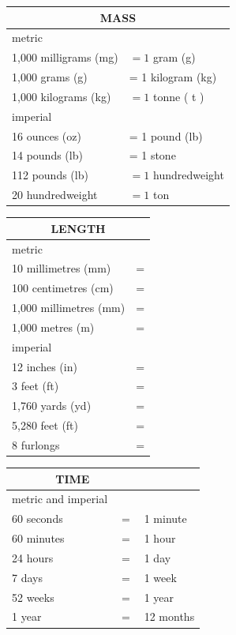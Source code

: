 \documentclass[10pt]{article}
\begin{document}
\begin{center}
\begin{tabular}{|l|l|}
\hline
\multicolumn{2}{|c|}{MASS} \\
\hline
metric &  \\
\hline
1,000 milligrams (mg) & $=1$ gram (g) \\
\hline
1,000 grams (g) & = 1 kilogram (kg) \\
\hline
1,000 kilograms (kg) & $=1$ tonne ( t ) \\
\hline
imperial &  \\
\hline
16 ounces (oz) & = 1 pound (lb) \\
\hline
14 pounds (lb) & = 1 stone \\
\hline
112 pounds (lb) & $=1$ hundredweight \\
\hline
20 hundredweight & $=1$ ton \\
\hline
\end{tabular}
\end{center}

\begin{center}
\begin{tabular}{|l|l|}
\hline
\multicolumn{2}{|c|}{LENGTH} \\
\hline
\multicolumn{2}{|l|}{metric} \\
\hline
10 millimetres (mm) & = \\
\hline
100 centimetres (cm) & = \\
\hline
1,000 millimetres (mm) & = \\
\hline
1,000 metres (m) & = \\
\hline
\multicolumn{2}{|l|}{imperial} \\
\hline
12 inches (in) & = \\
\hline
3 feet (ft) & = \\
\hline
1,760 yards (yd) & = \\
\hline
5,280 feet (ft) & = \\
\hline
8 furlongs & = \\
\hline
\end{tabular}
\end{center}

\begin{center}
\begin{tabular}{|lll|}
\hline
\multicolumn{2}{|c|}{TIME} &  \\
\hline
metric and imperial &  &  \\
\hline
60 seconds & $=$ & 1 minute \\
\hline
60 minutes & $=$ & 1 hour \\
\hline
24 hours & $=$ & 1 day \\
\hline
7 days & $=$ & 1 week \\
\hline
52 weeks & $=$ & 1 year \\
\hline
1 year & $=$ & 12 months \\
\hline
\end{tabular}
\end{center}
\end{document}
